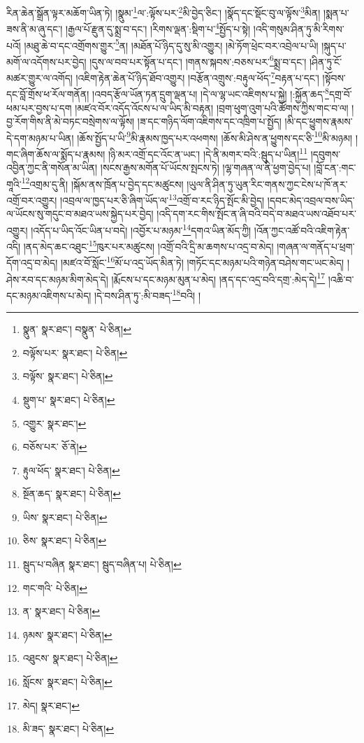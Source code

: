 རིན་ཆེན་སྒྲོན་ལྟར་མཆོག་ཡིན་ཏེ། །སྣུམ་\footnote{སྣུན་  སྣར་ཐང་། བསྣུན་  པེ་ཅིན། }ལ་:ལྟོས་པར་\footnote{བལྟོས་པར་  སྣར་ཐང་།  པེ་ཅིན། }མི་བྱེད་ཅིང་། །སྣོད་དང་སྡོང་བུ་ལ་ལྟོས་\footnote{བལྟོས་  སྣར་ཐང་།  པེ་ཅིན། }མིན། །སྨན་པ་ཟས་ནི་མ་ཞུ་དང་། །རྒྱལ་པོ་རྫུན་དུ་སྨྲ་བ་དང་། །རིགས་ལྡན་:སྡིག་པ་\footnote{སྡུག་པ་  སྣར་ཐང་།  པེ་ཅིན། }སྤྱོད་པ་སྟེ། །འདི་གསུམ་ཤིན་ཏུ་མི་རིགས་པའོ། །མཐུ་ཆེ་བ་དང་འགྲོགས་གྱུར་\footnote{འགྱུར་  སྣར་ཐང་། }ན། །མཐོན་པོ་ཉིད་དུ་སུ་མི་འགྱུར། །མེ་ཏོག་ཕྲེང་བར་འབྲེལ་པ་ཡི། །སྐུད་པ་མགོ་ལ་འདོགས་པར་བྱེད། །དུས་ལ་བབ་པར་སྟོན་པ་དང་། །གནས་སྐབས་:བཅས་པར་\footnote{བཅོས་པར་  ཅོ་ནེ། }སྨྲ་བ་དང་། །ཤིན་ཏུ་ངོ་མཚར་གྱུར་ལ་འགོད། །འཇིག་རྟེན་ཆེན་པོ་ཉིད་ཐོབ་འགྱུར། །བརྩོན་འགྲུས་:བརྟུལ་ཕོད་\footnote{རྟུལ་ཕོད་  སྣར་ཐང་།  པེ་ཅིན། }བརྟན་པ་དང་། །སྟོབས་དང་བློ་གྲོས་ཕ་རོལ་གནོན། །འབད་རྩོལ་ཡོན་ཏན་དྲུག་ལྡན་པ། །དེ་ལ་ལྷ་ཡང་འཇིགས་པ་སྐྱེ། །:སྐྱོན་ཆད་\footnote{སྔོན་ཆད་  སྣར་ཐང་།  པེ་ཅིན། }དགྲ་བོ་ཕམ་པར་བྱས་པ་དག །མཛའ་བོར་འདོད་འོངས་པ་ལ་ཡིད་མི་བརྟན། །བྲག་ཕུག་འུག་པའི་ཚོགས་ཀྱིས་གང་བ་ལ། །བྱ་རོག་གིས་ནི་མེ་བཏང་བསྲེགས་ལ་ལྟོས། །ཟ་དང་གཉིད་ལོག་འཇིགས་དང་འཁྲིག་པ་སྤྱོད། །མི་དང་ཕྱུགས་རྣམས་དེ་དག་མཉམ་པ་ཡིན། །ཆོས་སྤྱོད་པ་ཡི་\footnote{ཡིས་  སྣར་ཐང་།  པེ་ཅིན། }མི་རྣམས་ཁྱད་པར་འཕགས། །ཆོས་མི་ཤེས་ན་ཕྱུགས་དང་ཅི་\footnote{ཅིས་  སྣར་ཐང་།  པེ་ཅིན། }མི་མཉམ། །གང་ཞིག་ཆོས་ལ་སྨོད་པ་རྣམས། །ཉི་མར་འགྲོ་དང་འོང་ན་ཡང་། །དེ་ནི་མགར་བའི་:སྦུད་པ་ཡིན།\footnote{སྦུད་པ་བཞིན  སྣར་ཐང་། སྦུད་བཞིན་པ།  པེ་ཅིན། } །དབུགས་འབྱིན་ཀྱང་ནི་གསོན་མ་ཡིན། །སངས་རྒྱས་མགོན་པོ་ཡོངས་སྤངས་ཏེ། །ལྷ་གཞན་ལ་ནི་ཕྱག་བྱེད་པ། །བློ་ངན་:གང་གཱའི་\footnote{གང་གའི་  པེ་ཅིན། }འགྲམ་དུ་ནི། །སྐོམ་ནས་ཁྲོན་པ་བྱེད་དང་མཚུངས། །ཡུལ་ནི་ཤིན་ཏུ་ཡུན་རིང་གནས་ཀྱང་ངེས་པ་ཁོ་ནར་འགྲོ་བར་འགྱུར། །འབྲལ་ལ་ཁྱད་པར་ཅི་ཞིག་ཡོད་ལ་\footnote{ན་  སྣར་ཐང་།  པེ་ཅིན། }འགྲོ་བ་རང་ཉིད་སྤོང་མི་བྱེད། །དབང་མེད་འབྲལ་བས་ཡིད་ལ་ཡོངས་སུ་གདུང་བ་མཐའ་ཡས་སྐྱེད་པར་བྱེད། །འདི་དག་རང་གིས་སྤོང་ན་ཞི་བའི་བདེ་བ་མཐའ་ཡས་འཐོབ་པར་འགྱུར། །འདོད་པ་ཡིད་འོང་ཡིན་པ་བདེ། །འབྱོར་པ་མཉམ་\footnote{ཉམས་  སྣར་ཐང་།  པེ་ཅིན། }དགའ་ཡིན་མོད་ཀྱི། །འོན་ཀྱང་འཚོ་བའི་འཇིག་རྟེན་འདི། །ནད་མེད་ཆང་འཐུང་\footnote{འཐུངས་  སྣར་ཐང་།  པེ་ཅིན། }ཁུར་པར་མཚུངས། །འགྲོ་བའི་དྲི་མ་ཆགས་པ་འདྲ་བ་མེད། །གཞན་ལ་གནོད་པ་ཕྲག་དོག་འདྲ་བ་མེད། །མཛའ་བོ་སློང་\footnote{སློངས་  སྣར་ཐང་།  པེ་ཅིན། }མོ་པ་འདྲ་ཡོད་མིན་ཏེ། །གཏོང་དང་མཉམ་པའི་གཉེན་བཤེས་གང་ཡང་མེད། །ཤེས་རབ་དང་མཉམ་མིག་མེད་དེ། །རྨོངས་པ་དང་མཉམ་མུན་པ་མེད། །ནད་དང་འདྲ་བའི་དགྲ་:མེད་དེ།\footnote{མེད།  སྣར་ཐང་། } །འཆི་བ་དང་མཉམ་འཇིགས་པ་མེད། །དེ་བས་ཤིན་ཏུ་:མི་བཟད་\footnote{མི་ཟད་  སྣར་ཐང་།  པེ་ཅིན། }བའི། །
